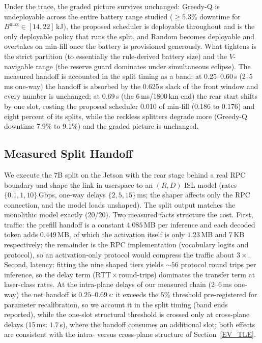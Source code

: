 Under the trace, the graded picture survives unchanged: Greedy-Q is
undeployable across the entire battery range studied ($\ge 5.3\%$ downtime for
$B^{\max}\in[14,22]$\,kJ), the proposed scheduler is deployable throughout and
is the only deployable policy that runs the split, and Random becomes
deployable and overtakes on min-fill once the battery is provisioned
generously. What tightens is the strict partition (to essentially the
rule-derived battery size) and the $V$-navigable range (the reserve guard
dominates under simultaneous eclipse). The measured handoff is accounted in
the split timing as a band: at 0.25--0.60\,s (2--5\,ms one-way) the handoff
is absorbed by the 0.625\,s slack of the front window and every number is
unchanged; at 0.69\,s (the 6\,ms/1800\,km end) the rear start shifts by one
slot, costing the proposed scheduler 0.010 of min-fill (0.186 to 0.176) and
eight percent of its splits, while the reckless splitters degrade more
(Greedy-Q downtime 7.9\% to 9.1\%) and the graded picture is unchanged.

\subsection{Measured Split Handoff}\label{EV_HANDOFF}
We execute the 7B split on the Jetson with the rear stage behind a real RPC
boundary and shape the link in userspace to an $(R, D)$ ISL model (rates
$\{0.1, 1, 10\}$\,Gbps, one-way delays $\{2, 5, 15\}$\,ms; the shaper affects
only the RPC connection, and the model loads unshaped). The split output
matches the monolithic model exactly (20/20). Two measured facts structure the
cost. First, traffic: the prefill handoff is a constant $4.085$\,MB per
inference and each decoded token adds $0.449$\,MB, of which the activation
itself is only $1.23$\,MB and $7$\,KB respectively; the remainder is the RPC
implementation (vocabulary logits and protocol), so an activation-only
protocol would compress the traffic about $3\times$. Second, latency: fitting
the nine shaped tiers yields ${\sim}56$ protocol round trips per inference, so
the delay term ($\mathrm{RTT}\times$round-trips) dominates the transfer term
at laser-class rates. At the intra-plane delays of our measured chain
(2--6\,ms one-way) the net handoff is $0.25$--$0.69$\,s: it exceeds the 5\%
threshold pre-registered for parameter recalibration, so we account it in the
split timing (band ends reported), while the one-slot structural threshold is
crossed only at cross-plane delays (15\,ms: $1.7$\,s), where the handoff
consumes an additional slot; both effects are consistent with the intra- versus
cross-plane structure of Section~\ref{EV_TLE}.
